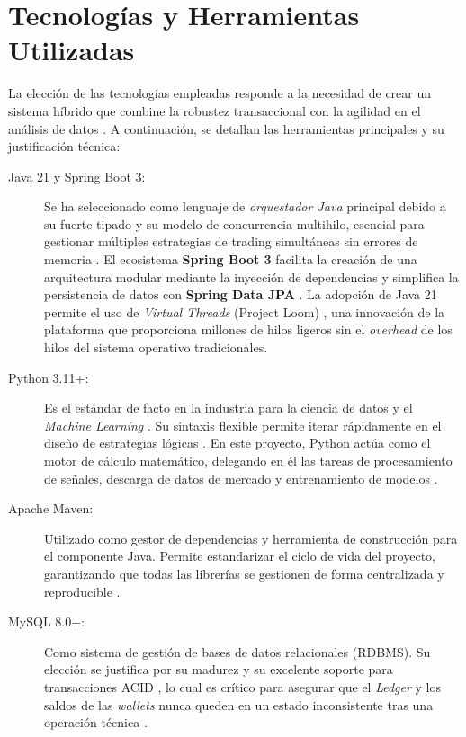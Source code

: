\section{Tecnologías y Herramientas Utilizadas}

La elección de las tecnologías empleadas responde a la necesidad de crear un 
sistema híbrido que combine la robustez transaccional con la agilidad en el 
análisis de datos \parencite{hilpisch_python_2018}. A continuación, se detallan 
las herramientas principales y su justificación técnica:

\begin{description}
    \item[Java 21 y Spring Boot 3:] Se ha seleccionado como lenguaje de 
    \textit{orquestador Java} principal debido a su fuerte tipado y su modelo de 
    concurrencia multihilo, esencial para gestionar múltiples estrategias de 
    trading simultáneas sin errores de memoria \parencite{treleaven_algorithmic_2013}. 
    El ecosistema \textbf{Spring Boot 3} facilita la creación de una arquitectura 
    modular mediante la inyección de dependencias y simplifica la persistencia 
    de datos con \textbf{Spring Data JPA} \parencite{pivotal_springboot_2024}. 
    La adopción de Java 21 permite el uso de \textit{Virtual Threads} (Project 
    Loom) \parencite{goetz_jep444_2023}, una innovación de la plataforma que 
    proporciona millones de hilos ligeros sin el \textit{overhead} de los hilos 
    del sistema operativo tradicionales.

    \item[Python 3.11+:] Es el estándar de facto en la industria para la ciencia 
    de datos y el \textit{Machine Learning} \parencite{goodfellow_deep_2016}. Su 
    sintaxis flexible permite iterar rápidamente en el diseño de estrategias 
    lógicas \parencite{hilpisch_python_2018}. En este proyecto, Python actúa 
    como el motor de cálculo matemático, delegando en él las tareas de 
    procesamiento de señales, descarga de datos de mercado y entrenamiento de 
    modelos \parencite{mckinney_python_2022}.

    \item[Apache Maven:] Utilizado como gestor de dependencias y herramienta de 
    construcción para el componente Java. Permite estandarizar el ciclo de vida 
    del proyecto, garantizando que todas las librerías se gestionen de forma 
    centralizada y reproducible \parencite{pivotal_springboot_2024}.

    \item[MySQL 8.0+:] Como sistema de gestión de bases de datos relacionales 
    (RDBMS). Su elección se justifica por su madurez y su excelente soporte para 
    transacciones ACID \parencite{oracle_mysql_acid_2024}, lo cual es crítico 
    para asegurar que el \textit{Ledger} y los saldos de las \textit{wallets} 
    nunca queden en un estado inconsistente tras una operación técnica 
    \parencite{oracle_mysql_2024}.


\end{description}
